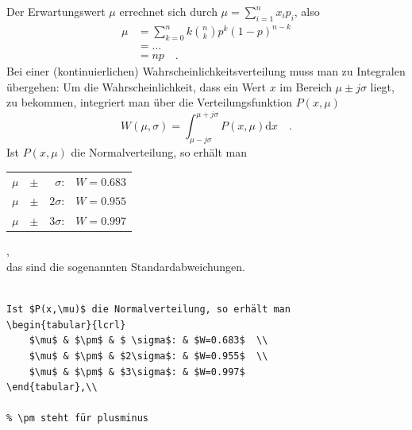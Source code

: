 \documentclass[12pt,a4paper]{scrartcl}
\begin{document}
Der Erwartungswert $\mu$ errechnet sich durch $\mu=\sum_{i=1}^n x_i p_i$, also
\begin{align}
    \mu &= \sum_{k=0}^n k \binom nk p^k (1-p)^{n-k}\\
        &= \dots \nonumber\\
        &= np\quad.
    \label{eq:erwartungswert}
\end{align}
Bei einer (kontinuierlichen) Wahrscheinlichkeitsverteilung muss man zu
Integralen übergehen:
Um die Wahrscheinlichkeit, dass ein Wert $x$ im Bereich $\mu \pm j\sigma$
liegt, zu bekommen, integriert man über die Verteilungsfunktion $P(x,\mu)$
\begin{equation}
    W(\mu, \sigma) = \int_{\mu-j\sigma}^{\mu+j\sigma} P(x,\mu) \mathrm{d}x\quad.
    \label{eq:Standardabweichung}
\end{equation}
Ist $P(x,\mu)$ die Normalverteilung, so erhält man 
\begin{tabular}{lcrl}
					$\mu$ & $\pm$&$\sigma$: & $W=0.683$  \\ 
					$\mu $&$\pm$&$2\sigma$: & $W=0.955$  \\ 
					$\mu $&$\pm$&$3\sigma$: & $W=0.997$ 
\end{tabular},\\
das sind die sogenannten Standardabweichungen.\\
\\
\begin{Verbatim}[frame=single]
Ist $P(x,\mu)$ die Normalverteilung, so erhält man 
\begin{tabular}{lcrl}
    $\mu$ & $\pm$ & $ \sigma$: & $W=0.683$  \\ 
    $\mu$ & $\pm$ & $2\sigma$: & $W=0.955$  \\ 
    $\mu$ & $\pm$ & $3\sigma$: & $W=0.997$ 
\end{tabular},\\

% \pm steht für plusminus
\end{Verbatim}
~\\
\cprotect{}
\end{document}
